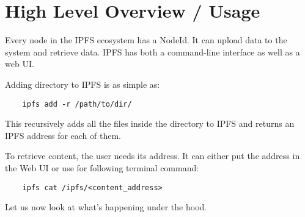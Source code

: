 \chapter{High Level Overview / Usage}

Every node in the IPFS ecosystem has a NodeId. It can upload data to the system and retrieve data. IPFS has both a command-line interface as well as a web UI.

Adding directory to IPFS is as simple as:

\begin{verbatim}
    ipfs add -r /path/to/dir/
\end{verbatim}

This recursively adds all the files inside the directory to IPFS and returns an IPFS address for each of them.

To retrieve content, the user needs its address. It can either put the address in the Web UI or use for following terminal command:

\begin{verbatim}
    ipfs cat /ipfs/<content_address>
\end{verbatim}

Let us now look at what's happening under the hood.